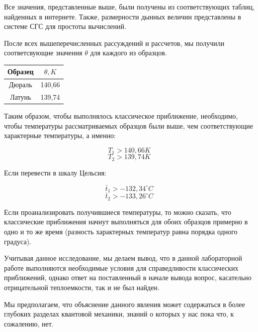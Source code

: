 \documentclass[a4paper,12pt]{article}
\begin{document}
Все значения, представленные выше, были получены из соответствующих таблиц, найденных в интернете. Также, размерности дынных величин представлены в системе СГС для простоты вычислений.

После всех вышеперечисленных рассуждений и рассчетов, мы получили соответсвующие значения $\theta$ для каждого из образцов.

\begin{center}
	\begin{tabular}{|c|c|}
		
		\hline
		Образец&	$\theta, K$
		\\
		\hline
		Дюраль&	140,66
		\\
		Латунь&	139,74
		\\
		\hline		
		
	\end{tabular}
\end{center}

Таким образом, чтобы выполнялось классическое приближение, необходимо, чтобы температуры рассматриваемых образцов были выше, чем соответствующие характерные температуры, а именно:

$$T_1 > 140,66K$$
$$T_2 > 139,74K$$

Если перевести в шкалу Цельсия:

$$\bar t_1 > -132,34^\circ C$$
$$\bar t_2 > -133,26^\circ C$$

Если проанализировать получившиеся температуры, то можно сказать, что классические приближения начнут выполняться для обоих образцов примерно в одно и то же время (разность характерных температур равна порядка одного градуса).

Учитывая данное исследование, мы делаем вывод, что в данной лабораторной работе выполняются необходимые условия для справедливости классических приближений, однако ответ на поставленный в начале вывода вопрос, касательно отрицательной теплоемкости, так и не был найден.

Мы предполагаем, что объяснение данного явления может содержаться в более глубоких разделах квантовой механики, знаний о которых у нас пока что, к сожалению, нет.
\end{document}
